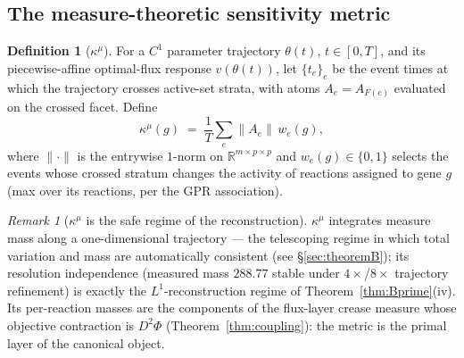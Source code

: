 \documentclass[11pt,a4paper]{article}
\theoremstyle{plain}
\theoremstyle{definition}
\newtheorem{definition}[theorem]{Definition}
\theoremstyle{remark}
\newtheorem{remark}[theorem]{Remark}
\newcommand{\kmu}{\kappa^{\mu}}
\newcommand{\RR}{\mathbb{R}}
\begin{document}
\subsection{The measure-theoretic sensitivity metric}

\begin{definition}[$\kmu$]\label{def:kmu}
For a $C^1$ parameter trajectory $\theta(t)$, $t \in [0,T]$, and its
piecewise-affine optimal-flux response $v(\theta(t))$, let
$\{t_e\}_e$ be the event times at which the trajectory crosses active-set
strata, with atoms $A_e = A_{F(e)}$ evaluated on the crossed facet. Define
\[
\kmu(g) \;=\; \frac{1}{T}\sum_{e} \bigl\| A_e \bigr\| \, w_e(g),
\]
where $\|{\cdot}\|$ is the entrywise $1$-norm on
$\RR^{m \times p \times p}$ and $w_e(g) \in \{0,1\}$ selects the events
whose crossed stratum changes the activity of reactions assigned to gene
$g$ (max over its reactions, per the GPR association).
\end{definition}

\begin{remark}[$\kmu$ is the safe regime of the reconstruction]
$\kmu$ integrates measure mass along a one-dimensional trajectory --- the
telescoping regime in which total variation and mass are automatically
consistent (see \S\ref{sec:theoremB}); its resolution
independence (measured mass $288.77$ stable under $4\times$/$8\times$
trajectory refinement) is exactly the $L^1$-reconstruction regime of
Theorem~\ref{thm:Bprime}(iv). Its per-reaction masses are the components of the
flux-layer crease measure whose objective contraction is $D^2\Phi$
(Theorem~\ref{thm:coupling}): the metric is the primal layer of the
canonical object.
\end{remark}
\end{document}

